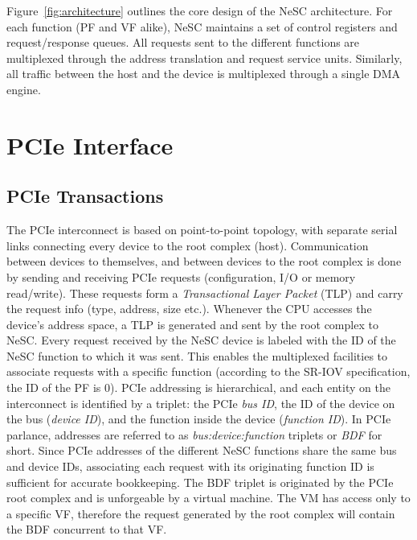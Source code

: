 Figure~\ref{fig:architecture} outlines the core design of the NeSC architecture. For each function (PF and VF alike), NeSC maintains a set of  control registers and request/response queues. All requests sent to the
different functions are multiplexed through the address translation and request service units. Similarly, all traffic between the host and the device is multiplexed through a single DMA engine. 

\section{PCIe Interface}
\label{arch:pcie}

\subsection*{PCIe Transactions}
\label{subsec:tlp}
The PCIe interconnect is based on point-to-point topology, with separate serial links connecting every device to the root complex (host).
Communication between devices to themselves, and between devices to the root complex is done by sending and receiving PCIe requests (configuration, I/O or memory read/write). These requests form a \emph{Transactional Layer
  Packet} (TLP) and carry the request info (type, address, size etc.). Whenever the CPU accesses the device's address space, a TLP is generated and sent by the root complex to NeSC.  
Every request received by the NeSC device is labeled with the ID of the NeSC function to which it was sent. This enables the multiplexed facilities to associate requests with a specific function (according to the SR-IOV specification, the ID of the PF is 0). PCIe addressing is hierarchical, and each entity on the interconnect is identified by a triplet: the PCIe \emph{bus ID}, the ID of the device on the bus (\emph{device ID}), and the function inside the device (\emph{function ID}). In PCIe parlance, addresses are referred to as \emph{bus:device:function} triplets or \emph{BDF} for short. Since PCIe addresses of the different NeSC functions share the same bus and device IDs, associating each request with its originating function ID is sufficient for accurate bookkeeping.
The BDF triplet is originated by the PCIe root complex and is unforgeable by a virtual machine. The VM has access only to a specific VF, therefore the request generated by the root complex  will contain the BDF concurrent to that VF.     


